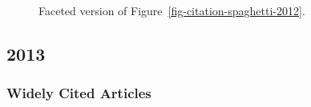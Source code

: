 \documentclass[
  10pt,
  letterpaper,
  DIV=11,
  numbers=noendperiod,
  twoside]{scrartcl}
\begin{document}
\begin{figure}


\caption{\label{fig-citation-facet-2012}Faceted version of
Figure~\ref{fig-citation-spaghetti-2012}.}

\end{figure}%

\newpage

\subsection{2013}\label{sec-s2013}

\subsubsection*{Widely Cited Articles}\label{widely-cited-articles-57}
\end{document}

